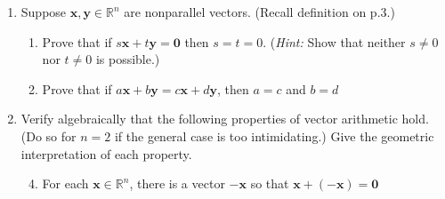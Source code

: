 \documentclass[letterpaper]{article}
\begin{document}
\begin{enumerate}
\begin{enumerate}
  \item
  Suppose $\mathbf{x},\mathbf{y}\in \mathbb{R}^n$ are nonparallel vectors. (Recall definition on p.3.)
    \begin{enumerate}
    \item
    Prove that if $s\mathbf{x}+t\mathbf{y}=\mathbf{0}$ then $s=t=0$. ({\it Hint:} Show that neither $s\ne 0$ nor $t\ne 0$ is possible.)
    \item
    Prove that if $a\mathbf{x}+b\mathbf{y}=c\mathbf{x}+d\mathbf{y}$, then $a=c$ and $b=d$
    \end{enumerate}
  \setcounter{enumii}{27}
  \item
  Verify algebraically that the following properties of vector arithmetic hold. (Do so for $n=2$ if the general case is too intimidating.) Give the geometric interpretation of each property.
    \begin{enumerate}
    \setcounter{enumiii}{3}
    \item
    For each $\mathbf{x}\in \mathbb{R}^n$, there is a vector $-\mathbf{x}$ so that $\mathbf{x}+(-\mathbf{x})=\mathbf{0}$
    \end{enumerate}
  \end{enumerate}
\end{enumerate}
\end{document}
